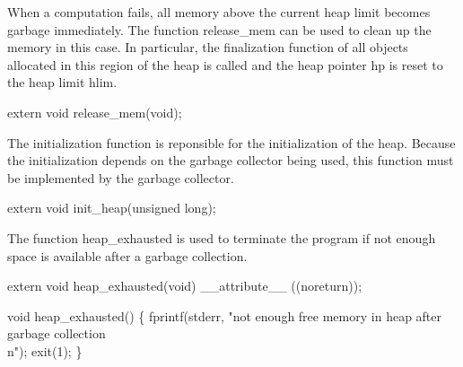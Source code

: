 \nwendcode{}\nwdocspar
When a computation fails, all memory above the current heap limit
becomes garbage immediately. The function {\Tt{}release{\_}mem\nwendquote} can be used
to clean up the memory in this case. In particular, the finalization
function of all objects allocated in this region of the heap is called
and the heap pointer {\Tt{}hp\nwendquote} is reset to the heap limit {\Tt{}hlim\nwendquote}.

\nwenddocs{}\plusendmoddef\nwstartdeflinemarkup{}\nwenddeflinemarkup
extern void release_mem(void);

\nwendcode{}\nwdocspar
The initialization function is reponsible for the initialization of
the heap. Because the initialization depends on the garbage collector
being used, this function must be implemented by the garbage
collector.

\nwenddocs{}\plusendmoddef\nwstartdeflinemarkup{}\nwenddeflinemarkup
extern void init_heap(unsigned long);

\nwendcode{}\nwdocspar
The function {\Tt{}heap{\_}exhausted\nwendquote} is used to terminate the program if
not enough space is available after a garbage collection.

\nwenddocs{}\plusendmoddef\nwstartdeflinemarkup{}\nwenddeflinemarkup
extern void heap_exhausted(void) __attribute__ ((noreturn));

\nwendcode{}\nwdocspar
\nwenddocs{}\plusendmoddef\nwstartdeflinemarkup{}\nwenddeflinemarkup
void
heap_exhausted()
\{
    fprintf(stderr,
            "not enough free memory in heap after garbage collection\\n");
    exit(1);
\}
\nwendcode{}

